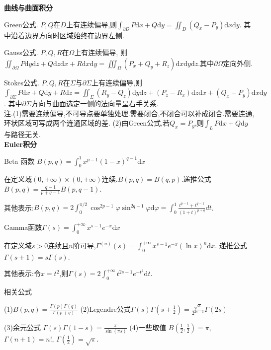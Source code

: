 \documentclass[UTF8]{ctexart}
\begin{document}
\noindent \textbf{曲线与曲面积分} \par 
\noindent Green公式. $P,Q$在$D$上有连续偏导,则$\int _{\partial D}P\mathrm{d}x+Q\mathrm{d}y=\iint_D (Q_x-P_y)\mathrm{d}x\mathrm{d}y$.
其中沿着边界方向时区域始终在边界左侧.\par 
\noindent Gauss公式. $P,Q,R$在$\Omega $上有连续偏导,
则$\iint _{\partial \Omega}P\mathrm{d}y\mathrm{d}z+Q\mathrm{d}z\mathrm{d}x+R\mathrm{d}x\mathrm{d}y=
\iiint_{\Omega} (P_x+Q_y+R_z)\mathrm{d}x\mathrm{d}y\mathrm{d}z$.其中$\partial \Omega$定向外侧. \par 
\noindent Stokes公式.  $P,Q,R$在$\Sigma$与$\partial \Sigma$上有连续偏导,则
$\int _{\partial \Sigma}P\mathrm{d}x+Q\mathrm{d}y+R\mathrm{d}z=
\iint_{\Sigma} (R_y-Q_z)\mathrm{d}y\mathrm{d}z+(P_z-R_x)\mathrm{d}z\mathrm{d}x+(Q_x-P_y)\mathrm{d}x\mathrm{d}y$.
其中$\partial \Sigma$方向与曲面选定一侧的法向量呈右手关系. \\
\noindent 注.\quad (1)需要连续偏导,不可导点要单独处理.需要闭合,不闭合可以补成闭合.需要连通,环状区域可写成两个连通区域的差.\quad 
(2)由Green公式,若$Q_x=P_y$,则$\int _L P \mathrm{d}x+Q \mathrm{d}y$与路径无关.\\


\noindent \textbf{Euler积分}\par 
\noindent Beta 函数 $B(p,q)=\int _0^1 x^{p-1}(1-x)^{q-1}\mathrm{d}x$\par 
在定义域$(0,+\infty)\times(0,+\infty)$连续.$B(p,q)=B(q,p)$.递推公式$B(p,q)=\frac{q-1}{p+q-1}B(p,q-1)$.\par 
其他表示:$B(p, q)=2 \int_{0}^{\pi / 2} \cos ^{2p-1} \varphi \sin ^{2q-1}\varphi \mathrm{d} \varphi
=\int_0^1 \frac{t^{p-1}+t^{q-1}}{(1+t)^{p+q}} dt$.\par 

\noindent Gamma函数$\Gamma(s)=\int _0^{+\infty}x^{s-1}e^{-x}\mathrm{d}x$ \par 
在定义域$s>0$连续且$n$阶可导,$\Gamma^{(n)}(s)=\int _0^{+\infty}x^{s-1}e^{-x}(\ln x)^n\mathrm{d}x$.
递推公式$\Gamma (s+1)=s\Gamma(s)$.\par 
其他表示:令$x=t^2$,则$\Gamma(s)=2\int _0^{+\infty}t^{2s-1}e^{-t^2}\mathrm{d}t$.

\noindent 相关公式\par 
(1)$B(p,q)=\frac{\Gamma(p)\Gamma(q)}{\Gamma(p+q)}$ \qquad 
(2)Legendre公式\quad $\Gamma(s)\Gamma(s+\frac{1}{2})=\frac{\sqrt{\pi}}{2^{2s-1}}\Gamma(2s)$\par 
(3)余元公式  $\Gamma(s)\Gamma(1-s)=\frac{\pi}{\sin (\pi s)}$ \qquad 
(4)一些取值 $B(\frac{1}{2},\frac{1}{2})=\pi$, $\Gamma(n+1)=n!$, $\Gamma(\frac{1}{2})=\sqrt{\pi }$.
\end{document}
